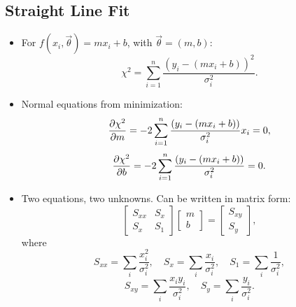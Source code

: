 \subsection{Straight Line Fit}
\begin{itemize}
      \item For $f(x_i, \vec{\theta}) = m x_i + b$, with $\vec{\theta} = (m, b)$:
            \[
                  \chi^2 = \sum_{i=1}^{n} \frac{(y_i - (m x_i + b))^2}{\sigma_i^2}.
            \]
      \item Normal equations from minimization:
            \[
                  \pdv{\chi^2}{m} = -2 \sum_{i=1}^{n} \frac{(y_i - (m x_i + b))}{\sigma_i^2} x_i = 0,
            \]
            \[
                  \pdv{\chi^2}{b} = -2 \sum_{i=1}^{n} \frac{(y_i - (m x_i + b))}{\sigma_i^2} = 0.
            \]
      \item Two equations, two unknowns. Can be written in matrix form:
            \[
                  \begin{bmatrix}
                        S_{xx} & S_x \\
                        S_x    & S_1
                  \end{bmatrix}
                  \begin{bmatrix}
                        m \\
                        b
                  \end{bmatrix}
                  =
                  \begin{bmatrix}
                        S_{xy} \\
                        S_y
                  \end{bmatrix},
            \]
            where
            \[
                  S_{xx} = \sum_i \frac{x_i^2}{\sigma_i^2}, \quad
                  S_x = \sum_i \frac{x_i}{\sigma_i^2}, \quad
                  S_1 = \sum_i \frac{1}{\sigma_i^2},
            \]
            \[
                  S_{xy} = \sum_i \frac{x_i y_i}{\sigma_i^2}, \quad
                  S_y = \sum_i \frac{y_i}{\sigma_i^2}.
            \]
\end{itemize}

